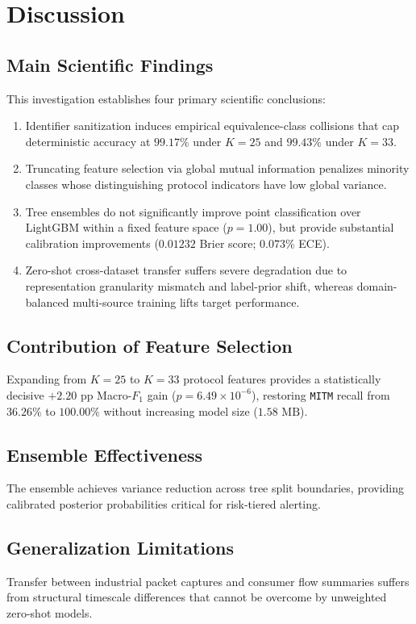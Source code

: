 \documentclass[10pt,journal,twocolumn]{IEEEtran}
\begin{document}
\section{Discussion}

\subsection{Main Scientific Findings}
This investigation establishes four primary scientific conclusions:
\begin{enumerate}
    \item Identifier sanitization induces empirical equivalence-class collisions that cap deterministic accuracy at $99.17\%$ under $K=25$ and $99.43\%$ under $K=33$.
    \item Truncating feature selection via global mutual information penalizes minority classes whose distinguishing protocol indicators have low global variance.
    \item Tree ensembles do not significantly improve point classification over LightGBM within a fixed feature space ($p=1.00$), but provide substantial calibration improvements ($0.01232$ Brier score; $0.073\%$ ECE).
    \item Zero-shot cross-dataset transfer suffers severe degradation due to representation granularity mismatch and label-prior shift, whereas domain-balanced multi-source training lifts target performance.
\end{enumerate}

\subsection{Contribution of Feature Selection}
Expanding from $K=25$ to $K=33$ protocol features provides a statistically decisive $+2.20\text{ pp}$ Macro-$F_1$ gain ($p=6.49\times 10^{-6}$), restoring \texttt{MITM} recall from $36.26\%$ to $100.00\%$ without increasing model size ($1.58\text{ MB}$).

\subsection{Ensemble Effectiveness}
The ensemble achieves variance reduction across tree split boundaries, providing calibrated posterior probabilities critical for risk-tiered alerting.

\subsection{Generalization Limitations}
Transfer between industrial packet captures and consumer flow summaries suffers from structural timescale differences that cannot be overcome by unweighted zero-shot models.
\end{document}
